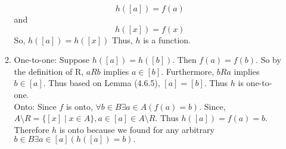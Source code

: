 \documentclass[10pt,a4paper]{article}
\begin{document}
\begin{enumerate}
\begin{enumerate}
$$h([a])=f(a)$$
and 
$$h([x])=f(x)$$
So, $h([a])=h([x])$
Thus, $h$ is a function.
\item One-to-one: Suppose $h([a])=h([b]) $. Then $f(a)=f(b)$. So by the definition of R, $aRb$ implies $a \in [b]$. Furthermore, $bRa$ implies $b \in [a]$. Thus based on Lemma (4.6.5), $[a]=[b]$. Thus $h$ is one-to-one.\\
Onto: Since $f$ is onto, $\forall b \in B \exists a \in A (f(a)=b).$ Since, $A\setminus R = \{[x] \mid x \in A \}, a \in [a] \in A\setminus R.$ Thus $h([a])=f(a)=b$. Therefore $h$ is onto because we found for any arbitrary $b \in B \exists a \in [a] (h([a])=b).$
\end{enumerate}
\end{enumerate}
\end{document}
